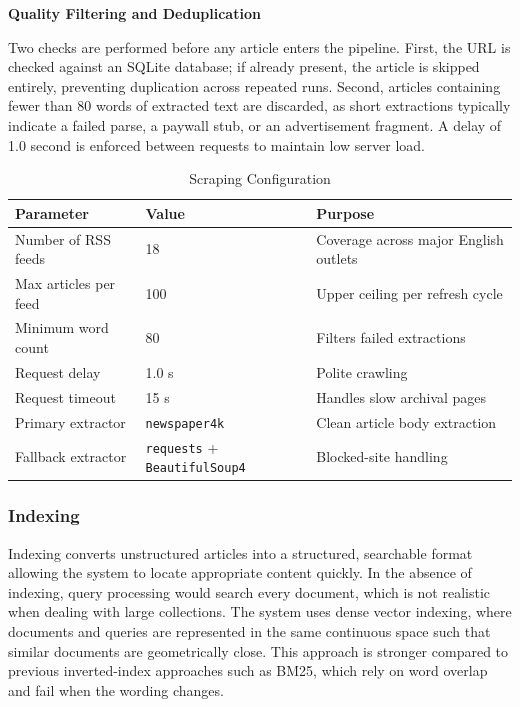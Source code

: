 \textbf{Quality Filtering and Deduplication}

Two checks are performed before any article enters the pipeline. First, the URL is checked against an SQLite database; if already present, the article is skipped entirely, preventing duplication across repeated runs. Second, articles containing fewer than 80 words of extracted text are discarded, as short extractions typically indicate a failed parse, a paywall stub, or an advertisement fragment. A delay of 1.0 second is enforced between requests to maintain low server load.

\begin{table}[H]
\caption{Scraping Configuration}
\label{tab:scraping_config}
\centering
\begin{tabularx}{\linewidth}{|l|l|X|}
\hline
\textbf{Parameter} & \textbf{Value} & \textbf{Purpose} \\
\hline
Number of RSS feeds & 18 & Coverage across major English outlets \\
Max articles per feed & 100 & Upper ceiling per refresh cycle \\
Minimum word count & 80 & Filters failed extractions \\
Request delay & 1.0 s & Polite crawling \\
Request timeout & 15 s & Handles slow archival pages \\
Primary extractor & \texttt{newspaper4k} & Clean article body extraction \\
Fallback extractor & \texttt{requests} + \texttt{BeautifulSoup4} & Blocked-site handling \\
\hline
\end{tabularx}
\end{table}

\subsubsection{Indexing}

Indexing converts unstructured articles into a structured, searchable format allowing the system to locate appropriate content quickly. In the absence of indexing, query processing would search every document, which is not realistic when dealing with large collections. The system uses dense vector indexing, where documents and queries are represented in the same continuous space such that similar documents are geometrically close. This approach is stronger compared to previous inverted-index approaches such as BM25, which rely on word overlap and fail when the wording changes.

